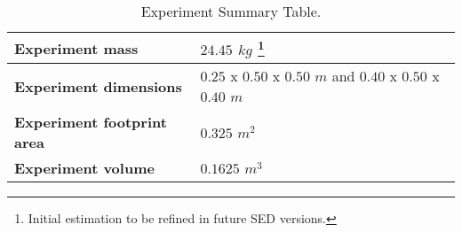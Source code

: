 \begin{table}[!ht]
\centering
\begin{tabular}{|l|l|}
\hline
 \textbf{Experiment mass}  & $24.45$ $kg$ \footnote[13]{Initial estimation to be refined in future SED versions.} \\ \hline
 \textbf{Experiment dimensions} & $0.25$ x $0.50$ x $0.50$ $m$ and $0.40$ x $0.50$ x $0.40$ $m$ \\ \hline
 \textbf{Experiment footprint area} & $0.325$ $m^2$ \\ \hline
 \textbf{Experiment volume}  & $0.1625$ $m^3$ \\ \hline
\end{tabular}
\caption{Experiment Summary Table.}
\label{dimensions_mass}
\end{table}
\raggedbottom